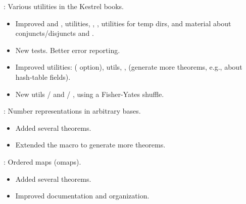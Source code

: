 
\begin{frame}

\implibtitle

:
Various utilities in the Kestrel books.
\begin{itemize}
\item Improved  and ,  utilities, , , utilities for temp dirs, and material about conjuncts/disjuncts and .
\item New tests. Better error reporting.
\item Improved utilities:  ( option),  utils, ,  (generate more theorems, e.g., about hash-table fields).
\item New utils  /  and  / , using a Fisher-Yates shuffle.
\end{itemize}

\end{frame}


\begin{frame}

\implibtitle

:
Number representations in arbitrary bases.
\begin{itemize}
\item Added several theorems.
\item Extended the  macro to generate more theorems.
\end{itemize}

\end{frame}


\begin{frame}

\implibtitle

:
Ordered maps (omaps).
\begin{itemize}
\item Added several theorems.
\item Improved documentation and organization.
\end{itemize}

\end{frame}

